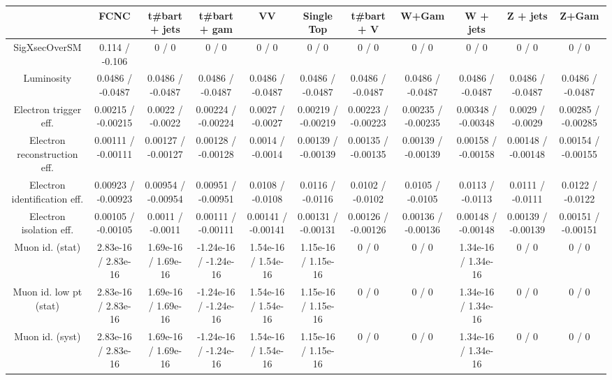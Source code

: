 \begin{table}[htbp]
\begin{center}
\footnotesize
\begin{tabular}{|c|c|c|c|c|c|c|c|c|c|c|}
\hline 
      & FCNC      & t#bar{t} + jets      & t#bar{t} +  gam      & VV      & Single Top      & t#bar{t} + V      & W+Gam      & W + jets      & Z + jets      & Z+Gam \\ 
\hline 
 SigXsecOverSM & 0.114 / -0.106 & 0 / 0 & 0 / 0 & 0 / 0 & 0 / 0 & 0 / 0 & 0 / 0 & 0 / 0 & 0 / 0 & 0 / 0 \\ 
  Luminosity & 0.0486 / -0.0487 & 0.0486 / -0.0487 & 0.0486 / -0.0487 & 0.0486 / -0.0487 & 0.0486 / -0.0487 & 0.0486 / -0.0487 & 0.0486 / -0.0487 & 0.0486 / -0.0487 & 0.0486 / -0.0487 & 0.0486 / -0.0487 \\ 
  Electron trigger eff. & 0.00215 / -0.00215 & 0.0022 / -0.0022 & 0.00224 / -0.00224 & 0.0027 / -0.0027 & 0.00219 / -0.00219 & 0.00223 / -0.00223 & 0.00235 / -0.00235 & 0.00348 / -0.00348 & 0.0029 / -0.0029 & 0.00285 / -0.00285 \\ 
  Electron reconstruction eff. & 0.00111 / -0.00111 & 0.00127 / -0.00127 & 0.00128 / -0.00128 & 0.0014 / -0.0014 & 0.00139 / -0.00139 & 0.00135 / -0.00135 & 0.00139 / -0.00139 & 0.00158 / -0.00158 & 0.00148 / -0.00148 & 0.00154 / -0.00155 \\ 
  Electron identification eff. & 0.00923 / -0.00923 & 0.00954 / -0.00954 & 0.00951 / -0.00951 & 0.0108 / -0.0108 & 0.0116 / -0.0116 & 0.0102 / -0.0102 & 0.0105 / -0.0105 & 0.0113 / -0.0113 & 0.0111 / -0.0111 & 0.0122 / -0.0122 \\ 
  Electron isolation eff. & 0.00105 / -0.00105 & 0.0011 / -0.0011 & 0.00111 / -0.00111 & 0.00141 / -0.00141 & 0.00131 / -0.00131 & 0.00126 / -0.00126 & 0.00136 / -0.00136 & 0.00148 / -0.00148 & 0.00139 / -0.00139 & 0.00151 / -0.00151 \\ 
  Muon id. (stat) & 2.83e-16 / 2.83e-16 & 1.69e-16 / 1.69e-16 & -1.24e-16 / -1.24e-16 & 1.54e-16 / 1.54e-16 & 1.15e-16 / 1.15e-16 & 0 / 0 & 0 / 0 & 1.34e-16 / 1.34e-16 & 0 / 0 & 0 / 0 \\ 
  Muon id. low pt (stat) & 2.83e-16 / 2.83e-16 & 1.69e-16 / 1.69e-16 & -1.24e-16 / -1.24e-16 & 1.54e-16 / 1.54e-16 & 1.15e-16 / 1.15e-16 & 0 / 0 & 0 / 0 & 1.34e-16 / 1.34e-16 & 0 / 0 & 0 / 0 \\ 
  Muon id. (syst) & 2.83e-16 / 2.83e-16 & 1.69e-16 / 1.69e-16 & -1.24e-16 / -1.24e-16 & 1.54e-16 / 1.54e-16 & 1.15e-16 / 1.15e-16 & 0 / 0 & 0 / 0 & 1.34e-16 / 1.34e-16 & 0 / 0 & 0 / 0 \\ 

\end{tabular}
\end{center}
\end{table}
